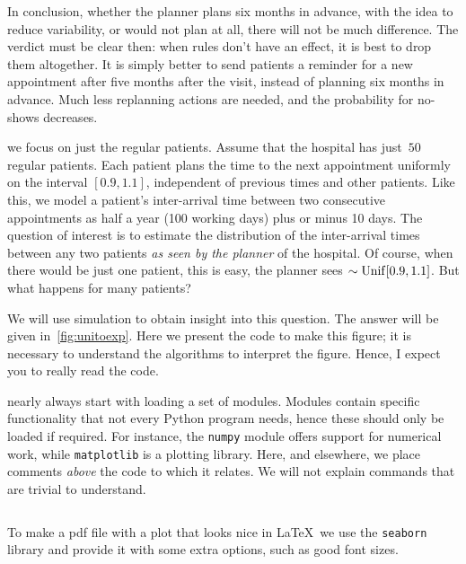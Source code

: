 \documentclass[stochastic-or.tex]{subfiles}
\begin{document}
In conclusion, whether the planner plans six months in advance, with the idea to reduce variability, or would not plan at all, there will not be much difference.
The verdict must be clear then: when rules don't have an effect, it is best to drop them altogether.
It is simply better to send patients a reminder for a new appointment after five months after the visit, instead of planning six months in advance.
Much less replanning actions are needed, and the probability for no-shows decreases.


 we focus on just the regular patients.
Assume that the hospital has just~$50$ regular patients.
Each patient plans the time to the next appointment uniformly on the interval $[0.9 , 1.1]$, independent of previous times and other patients.
Like this, we model a patient's inter-arrival time between two consecutive appointments as  half a year (100 working days) plus or minus 10 days.
The question of interest is to estimate the distribution of the inter-arrival times between any two patients \emph{as seen by the planner} of the hospital.
Of course, when there would be just one patient, this is easy, the planner sees $\sim \mathrm{Unif}[0.9, 1.1]$. But what happens for many patients?

We will use simulation to obtain insight into this question.
The answer will be given in~\cref{fig:unitoexp}.
Here we present the code to make this figure; it is necessary to understand the algorithms to interpret the figure.
Hence, I expect you to really read the code.

 nearly always start with loading a set of modules.
Modules contain specific functionality that not every Python program needs, hence these should only be loaded if required.
For instance, the \texttt{numpy} module offers support for numerical work, while \texttt{matplotlib} is a plotting library.
Here, and elsewhere, we place comments \emph{above} the code to which it relates.
We will not explain commands that are trivial to understand.

\inputminted[firstline=2, lastline=3]{python}{../code/IBD_simulations.py} %

To make a pdf file with a plot that looks nice in \LaTeX\, we  use the \texttt{seaborn} library and provide it with some extra options, such as good font sizes.
\inputminted[firstline=9, lastline=24]{python}{../code/IBD_simulations.py} %
\end{document}
